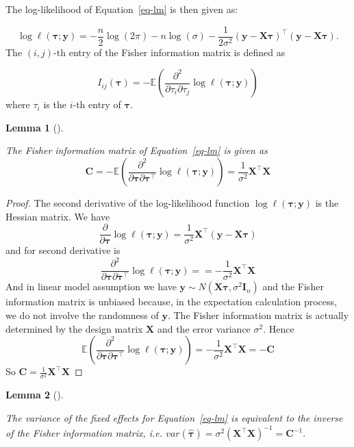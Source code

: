 \documentclass[
  a4paper,
  oneside,
  openany,
  12pt,
  onecolumn]{book}
\theoremstyle{plain}
\newtheorem{lemma}{Lemma}[chapter]
\theoremstyle{definition}
\theoremstyle{remark}
\begin{document}
The log-likelihood of Equation~\ref{eq-lm} is then given as:

\[
\log\ell(\boldsymbol{\tau};\boldsymbol{y}) = -\frac{n}{2}\log(2\pi)-n\log(\sigma)-\frac{1}{2\sigma^2}(\boldsymbol{y}-\boldsymbol{X}\boldsymbol{\tau})^\top(\boldsymbol{y}-\boldsymbol{X}\boldsymbol{\tau}).
\] The \((i,j)\)-th entry of the Fisher information matrix is defined as

\[
I_{ij}(\boldsymbol{\tau})=-\mathbb{E}\left(\frac{\partial^2}{\partial\tau_i\partial\tau_j}\log\ell(\boldsymbol{\tau};\boldsymbol{y})\right)
\] where \(\tau_i\) is the \(i\)-th entry of \(\boldsymbol{\tau}\).

\begin{lemma}[]\protect\hypertarget{lem-fim-lm}{}\label{lem-fim-lm}

The Fisher information matrix of Equation~\ref{eq-lm} is given as \[
\mathbf{C} = -\mathbb{E}\left(\frac{\partial^2}{\partial\boldsymbol{\tau}\partial\boldsymbol{\tau}^\top}\log\ell(\boldsymbol{\tau};\boldsymbol{y})\right)=\frac{1}{\sigma^2}\boldsymbol{X}^\top\boldsymbol{X}
\]

\end{lemma}

\begin{proof}
The second derivative of the log-likelihood function
\(\log\ell(\boldsymbol{\tau};\boldsymbol{y})\) is the Hessian matrix. We
have \[
\frac{\partial}{\partial\boldsymbol{\tau}}\log\ell(\boldsymbol{\tau};\boldsymbol{y})=\frac{1}{\sigma^2}\boldsymbol{X}^\top(\boldsymbol{y}-\boldsymbol{X}\boldsymbol{\tau})
\] and for second derivative is \[
\frac{\partial^2}{\partial\boldsymbol{\tau}\partial\boldsymbol{\tau}^\top}\log\ell(\boldsymbol{\tau};\boldsymbol{y})==-\frac{1}{\sigma^2}\boldsymbol{X}^\top\boldsymbol{X}
\] And in linear model assumption we have
\(\boldsymbol{y} \sim N(\mathbf{X}\boldsymbol{\tau}, \sigma^2\mathbf{I}_n)\)
and the Fisher information matrix is unbiased because, in the
expectation calculation process, we do not involve the randomness of
\(\boldsymbol{y}\). The Fisher information matrix is actually determined
by the design matrix \(\boldsymbol{X}\) and the error variance
\(\sigma^2\). Hence \[
\mathbb{E}\left(\frac{\partial^2}{\partial\boldsymbol{\tau}\partial\boldsymbol{\tau}^\top}\log\ell(\boldsymbol{\tau};\boldsymbol{y})\right)=-\frac{1}{\sigma^2}\boldsymbol{X}^\top\boldsymbol{X} = -\mathbf{C} 
\] So
\(\mathbf{C} = \frac{1}{\sigma^2}\boldsymbol{X}^\top\boldsymbol{X}\)
\end{proof}

\begin{lemma}[]\protect\hypertarget{lem-lm-var}{}\label{lem-lm-var}

The variance of the fixed effects for Equation~\ref{eq-lm} is equivalent
to the inverse of the Fisher information matrix, i.e.
\(var(\hat{\boldsymbol{\tau}})=\sigma^2(\boldsymbol{X}^\top\boldsymbol{X})^{-1} = \mathbf{C}^{-1}.\)

\end{lemma}
\end{document}
